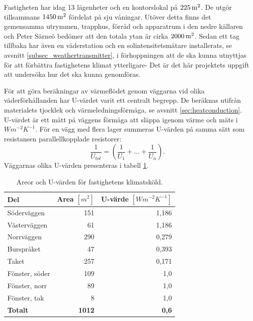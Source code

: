 Fastigheten har idag 13 lägenheter och en kontorslokal på $\unit[225]{m^2}$. De utgör tillsammans $\unit[1450]{m^2}$ fördelat på sju våningar. Utöver detta finns det gemensamma utrymmen, trapphus, förråd och apparatrum i den nedre källaren och Peter Särneö\cite{petersarneo} bedömer att den totala ytan är cirka $\unit[2000]{m^2}$. Sedan ett tag tillbaka har även en väderstation och en solintensitetsmätare installerats, se avsnitt \ref{subsec_weathertransmitter}, i förhoppningen att de ska kunna utnyttjas för att förbättra fastighetens klimat ytterligare- Det är det här projektets uppgift att undersöka hur det ska kunna genomföras.

För att göra beräkningar av värmeflödet genom väggarna vid olika väderförhållanden har U-värdet varit ett centralt begrepp. De beräknas utifrån materialets tjocklek och värmeledningsförmåga, se avsnitt \ref{sec:heatconduction}. U-värdet är ett mått på väggens förmåga att släppa igenom värme och mäts i $\unit{Wm^{-2}K^{-1}}$. För en vägg med flera lager summeras U-värden på samma sätt som resistansen parallellkopplade resistorer:
\begin{equation}
\label{eq:uvalue}
\frac{1}{U_{tot}}= (\frac{1}{U_1}+...+\frac{1}{U_n}).
\end{equation}
Väggarnas olika U-värden presenteras i tabell \ref{tbl:uvalue}.

\begin{table}[hbtp]
\centering
\caption{Areor och U-värden för fastighetens klimatsköld.}
\label{tbl:uvalue}

\begin{tabular}
{|l|r|r|}
\hline
\textbf{Del} & \textbf{Area $[\unit{m^2}]$} & \parbox[c][1.2cm][c]{2 cm}{\textbf{U-värde\\$[\unit{Wm^{-2}K^{-1}}]$}} \\
\hline
Söderväggen &  151 & 1,186 \\ 
Västerväggen & 61 & 1,186 \\
Norrväggen & 290 & 0,279 \\
Burspråket & 47 & 0,393 \\
Taket & 257 & 0,171 \\
\hline
Fönster, söder & 109 & 1,0 \\
Fönster, norr & 89 & 1,0 \\
Fönster, tak & 8 & 1,0 \\
\hline
\textbf{Totalt} & \textbf{1012} & \textbf{0,6}\\
\hline
\end{tabular}
\end{table}

